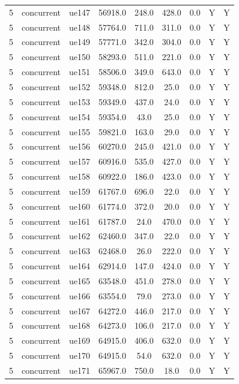 \begin{table}[ht]
\begin{tabular}{|c|c|c|c|c|c|c|c|c|}
5 & concurrent & ue147 & 56918.0 & 248.0 & 428.0 & 0.0 & Y & Y \\
5 & concurrent & ue148 & 57764.0 & 711.0 & 311.0 & 0.0 & Y & Y \\
5 & concurrent & ue149 & 57771.0 & 342.0 & 304.0 & 0.0 & Y & Y \\
5 & concurrent & ue150 & 58293.0 & 511.0 & 221.0 & 0.0 & Y & Y \\
5 & concurrent & ue151 & 58506.0 & 349.0 & 643.0 & 0.0 & Y & Y \\
5 & concurrent & ue152 & 59348.0 & 812.0 & 25.0 & 0.0 & Y & Y \\
5 & concurrent & ue153 & 59349.0 & 437.0 & 24.0 & 0.0 & Y & Y \\
5 & concurrent & ue154 & 59354.0 & 43.0 & 25.0 & 0.0 & Y & Y \\
5 & concurrent & ue155 & 59821.0 & 163.0 & 29.0 & 0.0 & Y & Y \\
5 & concurrent & ue156 & 60270.0 & 245.0 & 421.0 & 0.0 & Y & Y \\
5 & concurrent & ue157 & 60916.0 & 535.0 & 427.0 & 0.0 & Y & Y \\
5 & concurrent & ue158 & 60922.0 & 186.0 & 423.0 & 0.0 & Y & Y \\
5 & concurrent & ue159 & 61767.0 & 696.0 & 22.0 & 0.0 & Y & Y \\
5 & concurrent & ue160 & 61774.0 & 372.0 & 20.0 & 0.0 & Y & Y \\
5 & concurrent & ue161 & 61787.0 & 24.0 & 470.0 & 0.0 & Y & Y \\
5 & concurrent & ue162 & 62460.0 & 347.0 & 22.0 & 0.0 & Y & Y \\
5 & concurrent & ue163 & 62468.0 & 26.0 & 222.0 & 0.0 & Y & Y \\
5 & concurrent & ue164 & 62914.0 & 147.0 & 424.0 & 0.0 & Y & Y \\
5 & concurrent & ue165 & 63548.0 & 451.0 & 278.0 & 0.0 & Y & Y \\
5 & concurrent & ue166 & 63554.0 & 79.0 & 273.0 & 0.0 & Y & Y \\
5 & concurrent & ue167 & 64272.0 & 446.0 & 217.0 & 0.0 & Y & Y \\
5 & concurrent & ue168 & 64273.0 & 106.0 & 217.0 & 0.0 & Y & Y \\
5 & concurrent & ue169 & 64915.0 & 406.0 & 632.0 & 0.0 & Y & Y \\
5 & concurrent & ue170 & 64915.0 & 54.0 & 632.0 & 0.0 & Y & Y \\
5 & concurrent & ue171 & 65967.0 & 750.0 & 18.0 & 0.0 & Y & Y \\

\end{tabular}
\end{table}
